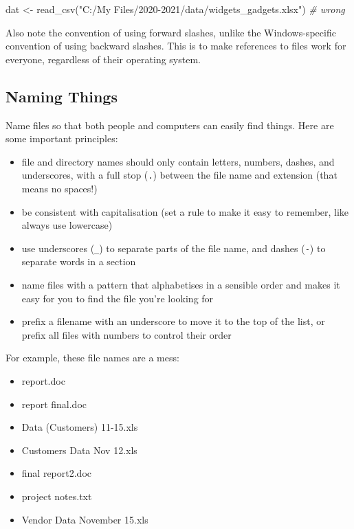 \documentclass[
  oneside]{book}
\newenvironment{Shaded}{\begin{snugshade}}{\end{snugshade}}
\newcommand{\CommentTok}[1]{\textcolor[rgb]{0.56,0.35,0.01}{\textit{#1}}}
\newcommand{\FunctionTok}[1]{\textcolor[rgb]{0.00,0.00,0.00}{#1}}
\newcommand{\NormalTok}[1]{#1}
\newcommand{\OtherTok}[1]{\textcolor[rgb]{0.56,0.35,0.01}{#1}}
\newcommand{\StringTok}[1]{\textcolor[rgb]{0.31,0.60,0.02}{#1}}
\providecommand{\tightlist}{%
  \setlength{\itemsep}{0pt}\setlength{\parskip}{0pt}}
\begin{document}
\begin{Shaded}
\begin{Highlighting}[]
\NormalTok{dat }\OtherTok{\textless{}{-}} \FunctionTok{read\_csv}\NormalTok{(}\StringTok{"C:/My Files/2020{-}2021/data/widgets\_gadgets.xlsx"}\NormalTok{)   }\CommentTok{\# wrong}
\end{Highlighting}
\end{Shaded}

\begin{info}
Also note the convention of using forward slashes, unlike the Windows-specific convention of using backward slashes. This is to make references to files work for everyone, regardless of their operating system.

\end{info}

\hypertarget{naming-things}{%
\subsection{Naming Things}\label{naming-things}}

Name files so that both people and computers can easily find things. Here are some important principles:

\begin{itemize}
\tightlist
\item
  file and directory names should only contain letters, numbers, dashes, and underscores, with a full stop (\texttt{.}) between the file name and extension (that means no spaces!)
\item
  be consistent with capitalisation (set a rule to make it easy to remember, like always use lowercase)
\item
  use underscores (\texttt{\_}) to separate parts of the file name, and dashes (\texttt{-}) to separate words in a section
\item
  name files with a pattern that alphabetises in a sensible order and makes it easy for you to find the file you're looking for
\item
  prefix a filename with an underscore to move it to the top of the list, or prefix all files with numbers to control their order
\end{itemize}

For example, these file names are a mess:

\begin{itemize}
\tightlist
\item
  report.doc
\item
  report final.doc
\item
  Data (Customers) 11-15.xls
\item
  Customers Data Nov 12.xls
\item
  final report2.doc
\item
  project notes.txt
\item
  Vendor Data November 15.xls
\end{itemize}
\end{document}
